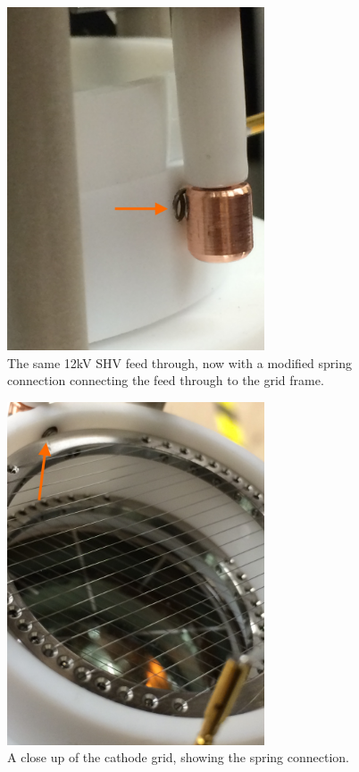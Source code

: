 \begin{figure}[htbp]
\begin{center}
\includegraphics[width=3in]{figures/testbed/ft2_1.jpg}
\caption{The same 12kV SHV feed through, now with a modified spring connection connecting the feed through to the grid frame.}
\label{fig:ft2_1}
\end{center}
\end{figure}

\begin{figure}[htbp]
\begin{center}
\includegraphics[width=3in]{figures/testbed/ft2_2.jpg}
\caption{A close up of the cathode grid, showing the spring connection.}
\label{fig:ft2_2}
\end{center}
\end{figure}


